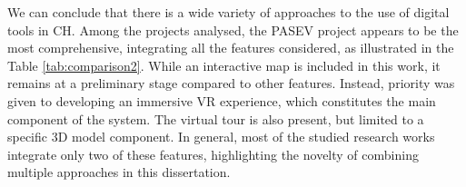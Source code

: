 \begin{table}[h!]
  \caption{Comparison of Projects Functionalities.}
  \label{tab:comparison2}
\end{table}

We can conclude that there is a wide variety of approaches to the use of digital tools in \gls{CH}. Among the projects analysed, the PASEV project appears to be the most comprehensive, integrating all the features considered, as illustrated in the Table \ref{tab:comparison2}.
While an interactive map is included in this work, it remains at a preliminary stage compared to other features. 
Instead, priority was given to developing an immersive \gls{VR} experience, which constitutes the main component of the system. The virtual tour is also present, but limited to a specific \gls{3D} model component. 
In general, most of the studied research works integrate only two of these features, highlighting the novelty of combining multiple approaches in this dissertation.



